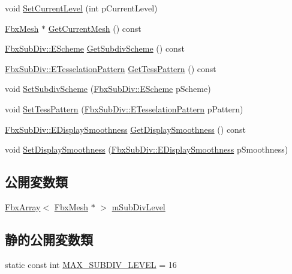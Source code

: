 \begin{DoxyCompactItemize}
\item 
void \hyperlink{class_fbx_sub_div_a448c996531d5c466ac1b8690fab652a2}{Set\+Current\+Level} (int p\+Current\+Level)
\item 
\hyperlink{class_fbx_mesh}{Fbx\+Mesh} $\ast$ \hyperlink{class_fbx_sub_div_a29e607504655d8d85f6354982ff58038}{Get\+Current\+Mesh} () const
\item 
\hyperlink{class_fbx_sub_div_aecdd4fdebb20f2796363989eba8ee9f5}{Fbx\+Sub\+Div\+::\+E\+Scheme} \hyperlink{class_fbx_sub_div_a9a0ebbb75fa4597b04a09058a4e5db0b}{Get\+Subdiv\+Scheme} () const
\item 
\hyperlink{class_fbx_sub_div_a06cb3da0d9b384dc83585caa49f46684}{Fbx\+Sub\+Div\+::\+E\+Tesselation\+Pattern} \hyperlink{class_fbx_sub_div_aef8fee5ac4e87bdc77606b70b61a279f}{Get\+Tess\+Pattern} () const
\item 
void \hyperlink{class_fbx_sub_div_aca6fac923a222a2f0b2841e0138559c0}{Set\+Subdiv\+Scheme} (\hyperlink{class_fbx_sub_div_aecdd4fdebb20f2796363989eba8ee9f5}{Fbx\+Sub\+Div\+::\+E\+Scheme} p\+Scheme)
\item 
void \hyperlink{class_fbx_sub_div_ab9489633777763369cc14a617d567488}{Set\+Tess\+Pattern} (\hyperlink{class_fbx_sub_div_a06cb3da0d9b384dc83585caa49f46684}{Fbx\+Sub\+Div\+::\+E\+Tesselation\+Pattern} p\+Pattern)
\item 
\hyperlink{class_fbx_sub_div_a7583b5d09f0eef70bad4563dffbb7e4d}{Fbx\+Sub\+Div\+::\+E\+Display\+Smoothness} \hyperlink{class_fbx_sub_div_ab61e0d75fa69cb90a7ef81f4f2ea917a}{Get\+Display\+Smoothness} () const
\item 
void \hyperlink{class_fbx_sub_div_acee4b6e7c777fd8f61778582e176ed1c}{Set\+Display\+Smoothness} (\hyperlink{class_fbx_sub_div_a7583b5d09f0eef70bad4563dffbb7e4d}{Fbx\+Sub\+Div\+::\+E\+Display\+Smoothness} p\+Smoothness)
\end{DoxyCompactItemize}
\subsection*{公開変数類}
\begin{DoxyCompactItemize}
\item 
\hyperlink{class_fbx_array}{Fbx\+Array}$<$ \hyperlink{class_fbx_mesh}{Fbx\+Mesh} $\ast$ $>$ \hyperlink{class_fbx_sub_div_a4f4f0ffea9a17d4dc31ad9dcac3e89eb}{m\+Sub\+Div\+Level}
\end{DoxyCompactItemize}
\subsection*{静的公開変数類}
\begin{DoxyCompactItemize}
\item 
static const int \hyperlink{class_fbx_sub_div_aa98ca1fbe21bbb387a56fe893d902a1e}{M\+A\+X\+\_\+\+S\+U\+B\+D\+I\+V\+\_\+\+L\+E\+V\+EL} = 16
\end{DoxyCompactItemize}
